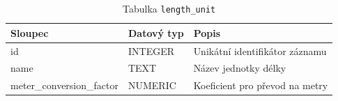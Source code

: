 \begin{table}[ht!]
    \centering
    \begin{tabularx}{\textwidth}{|l|l|L|}
        \hline
        \textbf{Sloupec}          & \textbf{Datový typ} & \textbf{Popis}                 \\ \hline
        id                        & INTEGER             & Unikátní identifikátor záznamu \\ \hline
        name                      & TEXT                & Název jednotky délky           \\ \hline
        meter\_conversion\_factor & NUMERIC             & Koeficient pro převod na metry \\ \hline
    \end{tabularx}
    \caption{Tabulka \texttt{length\_unit}}
    \label{tab:length_unit}
\end{table}
